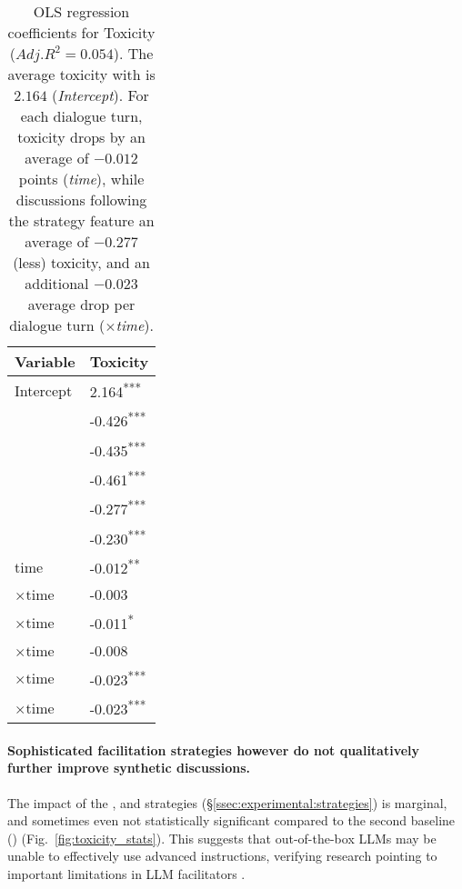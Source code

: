\begin{table}[t]
	\centering
	\begin{tabular}{l p{2.5cm}}
		\toprule
		\textbf{Variable} & \textbf{Toxicity} \\
		\midrule
		Intercept & 2.164\textsuperscript{***} \\
		\strategynoinstr & -0.426\textsuperscript{***} \\
		\strategymodgame & -0.435\textsuperscript{***} \\
		\strategyrules & -0.461\textsuperscript{***} \\
		\strategyregroom & -0.277\textsuperscript{***} \\
		\strategyconstrcomm & -0.230\textsuperscript{***} \\
		time & -0.012\textsuperscript{**} \\
		\strategynoinstr$\times$time & -0.003 \\
		\strategymodgame$\times$time & -0.011\textsuperscript{*} \\
		\strategyrules$\times$time & -0.008 \\
		\strategyregroom$\times$time & -0.023\textsuperscript{***} \\
		\strategyconstrcomm$\times$time & -0.023\textsuperscript{***} \\
		\bottomrule
	\end{tabular}
	\small
	\asterisknote
	\normalsize
	\caption{\ac{OLS} regression coefficients for Toxicity ($Adj. R^2=0.054$). The average toxicity with \emph{\strategynomod} is $2.164$ (\emph{Intercept}). For each dialogue turn, toxicity drops by an average of $-0.012$ points (\emph{time}), while discussions following the \emph{\strategyregroom} strategy feature an average of  $-0.277$ (less) toxicity, and an additional $-0.023$ average drop per dialogue turn (\emph{\strategyregroom}$\times$\textit{time}). }
	\label{tab:toxicity}
\end{table}

\paragraph{Sophisticated facilitation strategies however do not qualitatively further improve synthetic discussions.} The impact of the \emph{\strategyrules}, \emph{\strategyregroom} and \emph{\strategyconstrcomm}  strategies (\S\ref{ssec:experimental:strategies}) is marginal, and sometimes even not statistically significant compared to the second baseline (\emph{\strategynoinstr}) (Fig.~\ref{fig:toxicity_stats}). This suggests that out-of-the-box \acp{LLM} may be unable to effectively use advanced instructions, verifying research pointing to important limitations in \ac{LLM} facilitators \cite{cho-etal-2024-language}.

